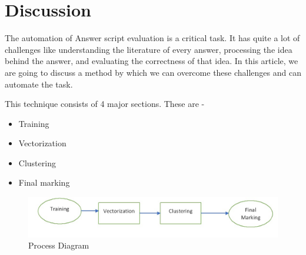 \newpage
\section{Discussion}
    \par
    The automation of Answer script evaluation is a critical task. It has quite a lot of challenges like 
    understanding the literature of every answer, processing the idea behind the answer, and evaluating the 
    correctness of that idea. In this article, we are going to discuss a method by which we can overcome these 
    challenges and can automate the task. 
    \par
    This technique consists of 4 major sections. These are - 
    \begin{itemize}
        \item Training
        \item Vectorization
        \item Clustering
        \item Final marking
    \end{itemize}

   \begin{figure}[H]
       \centering
       \includegraphics[width=1\linewidth]{IMAGE/steps.jpeg}
       \caption{ Process Diagram }
       \label{Steps}
   \end{figure}
%
